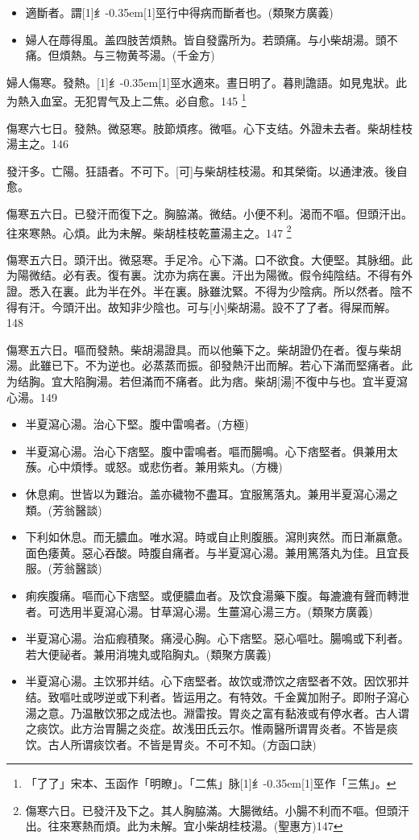 \documentclass[11pt,oneside,b5paper]{ctexbook}
\begin{document}
\begin{flushleft}
\begin{itemize}
\item 適斷者。謂{\hbox{\scalebox{0.68}[1]{纟}\kern-0.35em\scalebox{0.64}[1]{巠}}}行中得病而斷者也。(類聚方廣義)
\item 婦人在蓐得風。盖四肢苦煩熱。皆自發露所为。若頭痛。与小柴胡湯。頭不痛。但煩熱。与三物黄芩湯。(千金方)
\end{itemize}

婦人傷寒。發熱。{\hbox{\scalebox{0.68}[1]{纟}\kern-0.35em\scalebox{0.64}[1]{巠}}}水適來。晝日明了。暮則譫語。如見鬼狀。此为熱入血室。无犯胃气及上二焦。必自愈。145
\footnote{「了了」宋本、玉函作「明瞭」。「二焦」脉{\hbox{\scalebox{0.68}[1]{纟}\kern-0.35em\scalebox{0.64}[1]{巠}}}作「三焦」。}

傷寒六七日。發熱。微惡寒。肢節煩疼。微嘔。心下支结。外證未去者。柴胡桂枝湯主之。146

發汗多。亡陽。狂語者。不可下。[可]与柴胡桂枝湯。和其榮衛。以通津液。後自愈。

傷寒五六日。已發汗而復下之。胸脇滿。微结。小便不利。渴而不嘔。但頭汗出。往來寒熱。心煩。此为未解。柴胡桂枝乾薑湯主之。147
\footnote{傷寒六日。已發汗及下之。其人胸脇滿。大腸微结。小腸不利而不嘔。但頭汗出。往來寒熱而煩。此为未解。宜小柴胡桂枝湯。(聖惠方)147}

傷寒五六日。頭汗出。微惡寒。手足冷。心下滿。口不欲食。大便堅。其脉细。此为陽微结。必有表。復有裏。沈亦为病在裏。汗出为陽微。假令纯陰结。不得有外證。悉入在裏。此为半在外。半在裏。脉雖沈緊。不得为少陰病。所以然者。陰不得有汗。今頭汗出。故知非少陰也。可与[小]柴胡湯。設不了了者。得屎而解。148

傷寒五六日。嘔而發熱。柴胡湯證具。而以他藥下之。柴胡證仍在者。復与柴胡湯。此雖已下。不为逆也。必蒸蒸而振。卻發熱汗出而解。若心下滿而堅痛者。此为结胸。宜大陷胸湯。若但滿而不痛者。此为痞。柴胡[湯]不復中与也。宜半夏瀉心湯。149

\begin{itemize}
\item 半夏瀉心湯。治心下堅。腹中雷鳴者。(方極)
\item 半夏瀉心湯。治心下痞堅。腹中雷鳴者。嘔而腸鳴。心下痞堅者。俱兼用太蔟。心中煩悸。或怒。或悲伤者。兼用紫丸。(方機)
\item 休息痢。世皆以为難治。盖亦穢物不盡耳。宜服篤落丸。兼用半夏瀉心湯之類。(芳翁醫談)
\item 下利如休息。而无膿血。唯水瀉。時或自止則腹脹。瀉則爽然。而日漸羸惫。面色痿黄。惡心吞酸。時腹自痛者。与半夏瀉心湯。兼用篤落丸为佳。且宜長服。(芳翁醫談)
\item 痢疾腹痛。嘔而心下痞堅。或便膿血者。及饮食湯藥下腹。每漉漉有聲而轉泄者。可选用半夏瀉心湯。甘草瀉心湯。生薑瀉心湯三方。(類聚方廣義)
\item 半夏瀉心湯。治疝瘕積聚。痛浸心胸。心下痞堅。惡心嘔吐。腸鳴或下利者。若大便祕者。兼用消塊丸或陷胸丸。(類聚方廣義)
\item 半夏瀉心湯。主饮邪并结。心下痞堅者。故饮或滯饮之痞堅者不效。因饮邪并结。致嘔吐或哕逆或下利者。皆运用之。有特效。千金冀加附子。即附子瀉心湯之意。乃温散饮邪之成法也。淵雷按。胃炎之富有黏液或有停水者。古人谓之痰饮。此方治胃腸之炎症。故浅田氏云尔。惟兩醫所谓胃炎者。不皆是痰饮。古人所谓痰饮者。不皆是胃炎。不可不知。(方函口訣)
\end{itemize}


\end{flushleft}
\end{document}
